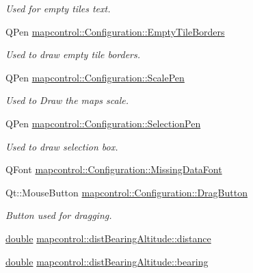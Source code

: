 \begin{DoxyCompactItemize}
\begin{DoxyCompactList}\small\item\em Used for empty tiles text. \end{DoxyCompactList}\item 
Q\-Pen \hyperlink{group___o_p_map_widget_gae8db48d6cb03fedba7aa82d206dc82eb}{mapcontrol\-::\-Configuration\-::\-Empty\-Tile\-Borders}
\begin{DoxyCompactList}\small\item\em Used to draw empty tile borders. \end{DoxyCompactList}\item 
Q\-Pen \hyperlink{group___o_p_map_widget_gab4e66a6217ae69c3344a0af8578f5932}{mapcontrol\-::\-Configuration\-::\-Scale\-Pen}
\begin{DoxyCompactList}\small\item\em Used to Draw the maps scale. \end{DoxyCompactList}\item 
Q\-Pen \hyperlink{group___o_p_map_widget_gab3ccb3d980f16de07166bad27b8ff4dc}{mapcontrol\-::\-Configuration\-::\-Selection\-Pen}
\begin{DoxyCompactList}\small\item\em Used to draw selection box. \end{DoxyCompactList}\item 
Q\-Font \hyperlink{group___o_p_map_widget_gacaef660cdedd3dc5c76abc6f6872b149}{mapcontrol\-::\-Configuration\-::\-Missing\-Data\-Font}
\item 
Qt\-::\-Mouse\-Button \hyperlink{group___o_p_map_widget_ga18190e2acae7a12ba6b598cf25244acf}{mapcontrol\-::\-Configuration\-::\-Drag\-Button}
\begin{DoxyCompactList}\small\item\em Button used for dragging. \end{DoxyCompactList}\item 
\hyperlink{_super_l_u_support_8h_a8956b2b9f49bf918deed98379d159ca7}{double} \hyperlink{group___o_p_map_widget_ga4f3ed7668339c6c63a158fe42d69f8ee}{mapcontrol\-::dist\-Bearing\-Altitude\-::distance}
\item 
\hyperlink{_super_l_u_support_8h_a8956b2b9f49bf918deed98379d159ca7}{double} \hyperlink{group___o_p_map_widget_ga473dc356430fb4d398c78d0fdde33ad1}{mapcontrol\-::dist\-Bearing\-Altitude\-::bearing}
\end{DoxyCompactItemize}
